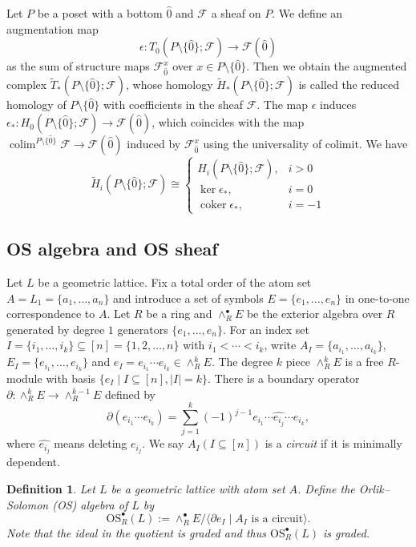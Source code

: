 \documentclass[10pt,a4paper]{amsart}
\numberwithin{equation}{section}
\newtheorem{defn}[thm]{Definition}
\numberwithin{equation}{section}
\newcommand{\FF}{\mathscr{F}}
\newcommand{\OS}{\mathrm{OS}}
\DeclareMathOperator{\colim}{colim}
\DeclareMathOperator{\coker}{coker}
\begin{document}
Let $P$ be a poset with a bottom $\hat{0}$ and $\FF$ a sheaf on $P$. We define an augmentation map 
\[
\epsilon: T_0(P\setminus\{\hat{0}\};\FF)\to\FF(\hat{0})
\]
as the sum of structure maps $\FF^x_{\hat{0}}$ over $x\in P\setminus\{\hat{0}\}$. Then we obtain the augmented complex $\widetilde{T}_*(P\setminus\{\hat{0}\};\FF)$, whose homology $\widetilde{H}_*(P\setminus\{\hat{0}\};\FF)$ is called the reduced homology of $P\setminus\{\hat{0}\}$ with coefficients in the sheaf $\FF$. The map $\epsilon$ induces $\epsilon_*: H_0(P\setminus\{\hat{0}\};\FF)\to \FF(\hat{0})$, which coincides with the map $\colim^{P\setminus\{\hat{0}\}}\FF\to\FF(\hat{0})$ induced by $\FF^x_{\hat{0}}$ using the universality of colimit. We have
\[
\widetilde{H}_i(P\setminus\{\hat{0}\};\FF)\cong \begin{cases}
    H_i(P\setminus\{\hat{0}\};\FF), & i>0\\
    \ker\epsilon_*, & i=0\\
    \coker\epsilon_*, & i=-1
\end{cases}
\]


\subsection{OS algebra and OS sheaf}

Let $L$ be a geometric lattice. Fix a total order of the atom set $A=L_1=\{a_1,\ldots,a_n\}$ and introduce a set of symbols $E=\{e_1,\ldots,e_n\}$ in one-to-one correspondence to $A$. 
Let $R$ be a ring and $\wedge^\bullet_RE$ be the exterior algebra over $R$ generated by degree $1$ generators $\{e_1,\ldots,e_n\}$. For an index set $I=\{i_1,\ldots,i_k\}\subseteq [n]=\{1,2,\ldots,n\}$ with $i_1<\cdots<i_k$, write $A_I=\{a_{i_1},\ldots,a_{i_k}\}$, $E_I=\{e_{i_1},\ldots,e_{i_k}\}$ and $e_I=e_{i_1}\cdots e_{i_k}\in \wedge^k_RE$.
The degree $k$ piece $\wedge_R^kE$ is a free $R$-module with basis $\{e_I\mid I\subseteq [n],|I|=k\}$. There is a boundary operator $\partial: \wedge^k_RE\to \wedge^{k-1}_RE$ defined by
\[
\partial(e_{i_1}\cdots e_{i_k})=\sum_{j=1}^k(-1)^{j-1}e_{i_1}\cdots \widehat{e_{i_j}}\cdots e_{i_k},
\]
where $\widehat{e_{i_j}}$ means deleting $e_{i_j}$. 
We say $A_I(I\subseteq [n])$ is a {\it circuit} if it is minimally dependent.
\begin{defn}
Let $L$ be a geometric lattice with atom set $A$. Define the Orlik--Solomon (OS) algebra of $L$ by
\[
\OS^\bullet_R(L):=\wedge^\bullet_RE/\langle \partial e_I\mid A_I \text{ is a circuit}\rangle.
\]
Note that the ideal in the quotient is graded and thus $\OS^\bullet_R(L)$ is graded.
\end{defn}
\end{document}
